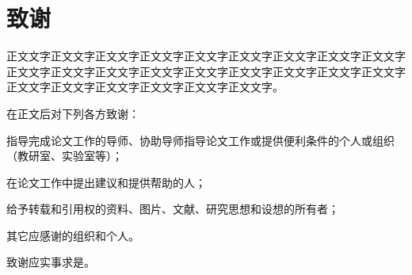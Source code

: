\chapter{致谢}
正文文字正文文字正文文字正文文字正文文字正文文字正文文字正文文字正文文字正文文字正文文字正文文字正文文字正文文字正文文字正文文字正文文字正文文字正文文字正文文字正文文字正文文字正文文字正文文字。

在正文后对下列各方致谢：

指导完成论文工作的导师、协助导师指导论文工作或提供便利条件的个人或组织（教研室、实验室等）；

在论文工作中提出建议和提供帮助的人；

给予转载和引用权的资料、图片、文献、研究思想和设想的所有者；

其它应感谢的组织和个人。

致谢应实事求是。
